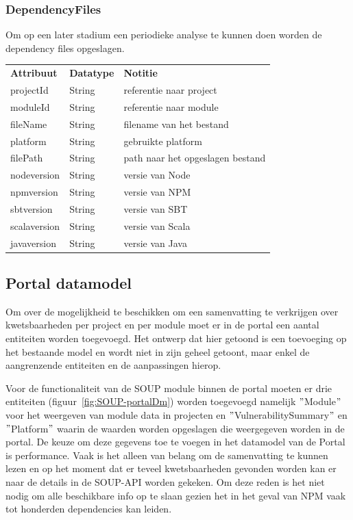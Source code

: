 \subsubsection{DependencyFiles}\label{subsubsec:dependencyFiles}
Om op een later stadium een periodieke analyse te kunnen doen worden de dependency files opgeslagen.

\begin{tabular}{lll}
    \textbf{Attribuut} & \textbf{Datatype} & \textbf{Notitie}                 \\
    projectId          & String            & referentie naar project          \\
    moduleId           & String            & referentie naar module           \\
    fileName           & String            & filename van het bestand         \\
    platform           & String            & gebruikte platform               \\
    filePath           & String            & path naar het opgeslagen bestand \\
    nodeversion        & String            & versie van Node                  \\
    npmversion         & String            & versie van NPM                   \\
    sbtversion         & String            & versie van SBT                   \\
    scalaversion       & String            & versie van Scala                 \\
    javaversion        & String            & versie van Java                  \\
\end{tabular}

\subsection{Portal datamodel}\label{subsec:portal-datamodel}
Om over de mogelijkheid te beschikken om een samenvatting te verkrijgen over kwetsbaarheden per project en per module moet er in de portal een aantal entiteiten worden toegevoegd. Het ontwerp dat hier getoond is een toevoeging op het bestaande model en wordt niet in zijn geheel getoont, maar enkel de aangrenzende entiteiten en de aanpassingen hierop.

Voor de functionaliteit van de SOUP module binnen de portal moeten er drie entiteiten (figuur~\ref{fig:SOUP-portalDm}) worden toegevoegd namelijk $"$Module$"$ voor het weergeven van module data in projecten en $"$VulnerabilitySummary$"$  en $"$Platform$"$ waarin de waarden worden opgeslagen die weergegeven worden in de portal. De keuze om deze gegevens toe te voegen in het datamodel van de Portal is performance. Vaak is het alleen van belang om de samenvatting te kunnen lezen en op het moment dat er teveel kwetsbaarheden gevonden worden kan er naar de details in de SOUP-API worden gekeken. Om deze reden is het niet nodig om alle beschikbare info op te slaan gezien het in het geval van NPM vaak tot honderden dependencies kan leiden.


